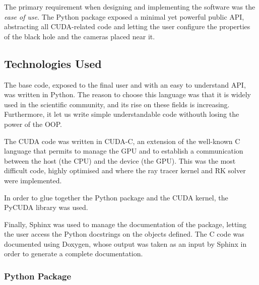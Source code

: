 The primary requirement when designing and implementing the software was the \emph{ease of use}. The Python package exposed a minimal yet powerful public \ac{API}, abstracting all \ac{CUDA}-related code and letting the user configure the properties of the black hole and the cameras placed near it.

\subsection{Technologies Used}

The base code, exposed to the final user and with an easy to understand \ac{API}, was written in Python. The reason to choose this language was that it is widely used in the scientific community, and its rise on these fields is increasing. Furthermore, it let us write simple understandable code withouth losing the power of the \ac{OOP}.

The \ac{CUDA} code was written in \ac{CUDA}-C, an extension of the well-known C language that permits to manage the \ac{GPU} and to establish a communication between the host (the \ac{CPU}) and the device (the \ac{GPU}). This was the most difficult code, highly optimised and where the ray tracer kernel and \ac{RK} solver were implemented.

In order to glue together the Python package and the \ac{CUDA} kernel, the PyCUDA library was used.

Finally, Sphinx was used to manage the documentation of the package, letting the user access the Python docstrings on the objects defined. The C code was documented using Doxygen, whose output was taken as an input by Sphinx in order to generate a complete documentation.

\subsubsection*{Python Package}

